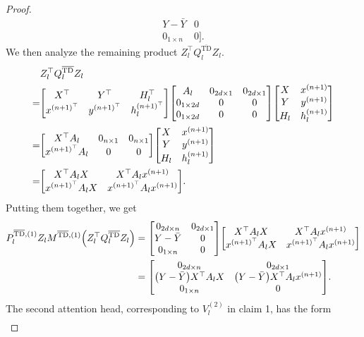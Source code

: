 \documentclass{article}
\newcommand{\bartd}{\overline{\text{TD}}}
\begin{document}
\begin{proof}
\begin{align}
                 Y - \bar{Y} & 0\\
                 0_{1\times n} & 0].
    \end{align}
    We then analyze the remaining product $Z_l^\top Q_l^{\bartd} Z_l$.
    \begin{align}
        & Z_l^\top Q_l^{\bartd} Z_l\\
        =& \mqty[X^\top & Y^\top & H_l^\top\\
                 x^{(n+1)^\top} & y^{(n+1)^\top} &  h_l^{(n+1)^\top}]
           \mqty[A_l & 0_{2d\times 1} & 0_{2d\times 1}\\
                  0_{1\times 2d} & 0 & 0\\
                  0_{1\times 2d} & 0 & 0]
           \mqty[X & x^{(n+1)}\\
                 Y & y^{(n+1)}\\
                 H_l & h_l^{(n+1)}]\\
        =& \mqty[X^\top A_l & 0_{n\times1} & 0_{n\times1}\\
                 x^{(n+1)^\top} A_l & 0 & 0]
           \mqty[X & x^{(n+1)}\\
                 Y & y^{(n+1)}\\
                 H_l & h_l^{(n+1)}]\\
        =& \mqty[X^\top A_l X & X^\top A_l x^{(n+1)}\\
                 x^{(n+1)^\top} A_l X & x^{(n+1)^\top} A_l x^{(n+1)}].
    \end{align}
    Putting them together, we get
    \begin{align}
        P_l^{\bartd, (1)} Z_l M^{\bartd, (1)} \qty(Z_l^\top Q_l^{\bartd} Z_l)
        &= \mqty[0_{2d\times n} & 0_{2d \times 1}\\
                 Y - \bar{Y} & 0\\
                 0_{1\times n} & 0]
            \mqty[X^\top A_l X & X^\top A_l x^{(n+1)}\\
                                 x^{(n+1)^\top} A_l X & x^{(n+1)^\top} A_l x^{(n+1)}]\\
        &= \mqty[0_{2d\times n} & 0_{2d \times 1}\\
                 \qty(Y - \bar{Y}) X^\top A_l X & \qty(Y - \bar{Y}) X^\top A_l x^{(n+1)}\\
                 0_{1\times n} & 0].
    \end{align}
    The second attention head, corresponding to $V_l^{(2)}$ in claim 1, has the form
    \begin{align}

\end{align}
\end{proof}
\end{document}
